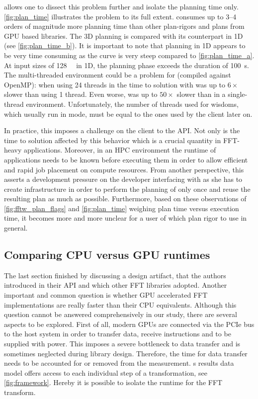 \gearshifft{} allows one to dissect this problem further and isolate the planning time only.
\cref{fig:plan_time} illustrates the problem to its full extent.  consumes up to 3--4 orders of magnitude more planning time than other plan-rigors and plans from GPU based libraries. The 3D planning is compared with its counterpart in 1D (see \cref{fig:plan_time_b}). It is important to note that \fftw{} planning in 1D appears to be very time consuming as the  curve is very steep compared to \cref{fig:plan_time_a}. At input sizes of \SI{128}{\mebi\byte} in 1D, the planning phase exceeds the duration of \SI{100}{\second}. The multi-threaded environment could be a problem for \fftw{} (compiled against OpenMP): when using 24 threads in \fftw{} the time to solution with  was up to $6{\times}$ slower than using 1 thread. Even worse,  was up to $50{\times}$ slower than in a single-thread environment. Unfortunately, the number of threads used for wisdoms, which usually run in  mode, must be equal to the ones used by the client later on.

In practice, this imposes a challenge on the client to the \fftw{} API. Not only is the time to solution affected by this behavior which is a crucial quantity in FFT-heavy applications. Moreover, in an HPC environment the runtime of applications needs to be known before executing them in order to allow efficient and rapid job placement on compute resources. From another perspective, this asserts a development pressure on the developer interfacing with \fftw{} as she has to create infrastructure in order to perform the planning of \fftw{} only once and reuse the resulting plan as much as possible. Furthermore, based on these observations of \cref{fig:fftw_plan_flags} and \cref{fig:plan_time} weighing plan time versus execution time, it becomes more and more unclear for a user of \fftw{} which plan rigor to use in general.

\subsection{Comparing CPU versus GPU runtimes}
\label{ssec:cpu_vs_gpu}

The last section finished by discussing a design artifact, that the \fftw{} authors introduced in their API and which other FFT libraries adopted. Another important and common question is whether GPU accelerated FFT implementations are really faster than their CPU equivalents. Although this question cannot be answered comprehensively in our study, there are several aspects to be explored. First of all, modern GPUs are connected via the PCIe bus to the host system in order to transfer data, receive instructions and to be supplied with power. This imposes a severe bottleneck to data transfer and is sometimes neglected during library design. Therefore, the time for data transfer needs to be accounted for or removed from the measurement. \gearshifft{}s results data model offers access to each individual step of a transformation, see \cref{fig:framework}. Hereby it is possible to isolate the runtime for the FFT transform.

